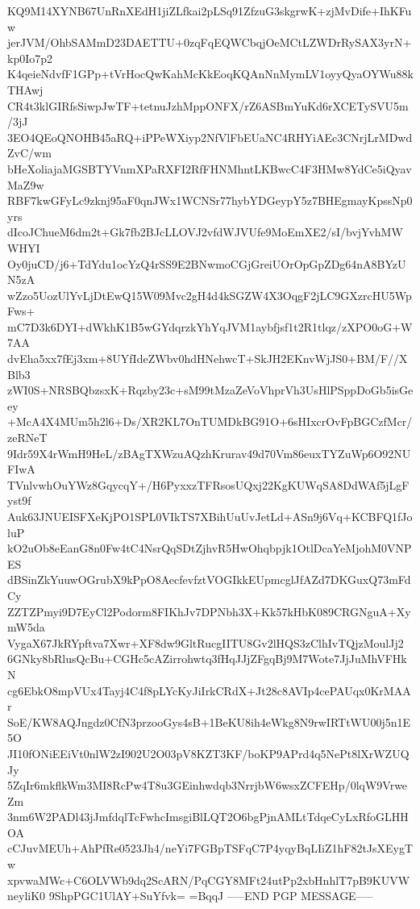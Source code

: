 KQ9M14XYNB67UnRnXEdH1jiZLfkai2pLSq91ZfzuG3skgrwK+zjMvDife+IhKFuw
jerJVM/OhbSAMmD23DAETTU+0zqFqEQWCbqjOeMCtLZWDrRySAX3yrN+kp0Io7p2
K4qeieNdvfF1GPp+tVrHocQwKahMcKkEoqKQAnNnMymLV1oyyQyaOYWu88kTHAwj
CR4t3klGIRfsSiwpJwTF+tetnuJzhMppONFX/rZ6ASBmYuKd6rXCETySVU5m/3jJ
3EO4QEoQNOHB45aRQ+iPPeWXiyp2NfVlFbEUaNC4RHYiAEc3CNrjLrMDwdZvC/wm
bHeXoliajaMGSBTYVnmXPaRXFI2RfFHNMhntLKBwcC4F3HMw8YdCe5iQyavMaZ9w
RBF7kwGFyLc9zknj95aF0qnJWx1WCNSr77hybYDGeypY5z7BHEgmayKpssNp0yrs
dIcoJChueM6dm2t+Gk7fb2BJcLLOVJ2vfdWJVUfe9MoEmXE2/sI/bvjYvhMWWHYI
Oy0juCD/j6+TdYdu1ocYzQ4rSS9E2BNwmoCGjGreiUOrOpGpZDg64nA8BYzUN5zA
wZzo5UozUlYvLjDtEwQ15W09Mvc2gH4d4kSGZW4X3OqgF2jLC9GXzrcHU5WpFws+
mC7D3k6DYI+dWkhK1B5wGYdqrzkYhYqJVM1aybfjsf1t2R1tlqz/zXPO0oG+W7AA
dvEha5xx7fEj3xm+8UYfIdeZWbv0hdHNehwcT+SkJH2EKnvWjJS0+BM/F//XBlb3
zWI0S+NRSBQbzsxK+Rqzby23c+sM99tMzaZeVoVhprVh3UsHlPSppDoGb5isGeey
+McA4X4MUm5h2l6+Ds/XR2KL7OnTUMDkBG91O+6sHIxcrOvFpBGCzfMcr/zeRNeT
9Idr59X4rWmH9HeL/zBAgTXWzuAQzhKrurav49d70Vm86euxTYZuWp6O92NUFIwA
TVnlvwhOuYWz8GqycqY+/H6PyxxzTFRsosUQxj22KgKUWqSA8DdWAf5jLgFyst9f
Auk63JNUEISFXeKjPO1SPL0VIkTS7XBihUuUvJetLd+ASn9j6Vq+KCBFQ1fJoluP
kO2uOb8eEanG8n0Fw4tC4NsrQqSDtZjhvR5HwOhqbpjk1OtlDcaYeMjohM0VNPES
dBSinZkYuuwOGrubX9kPpO8AecfevfztVOGIkkEUpmcglJfAZd7DKGuxQ73mFdCy
ZZTZPmyi9D7EyCl2Podorm8FIKhJv7DPNbh3X+Kk57kHbK089CRGNguA+XymW5da
VygaX67JkRYpftva7Xwr+XF8dw9GltRucgIITU8Gv2lHQS3zClhIvTQjzMoulJj2
6GNky8bRlusQcBu+CGHc5cAZirrohwtq3fHqJJjZFgqBj9M7Wote7JjJuMhVFHkN
cg6EbkO8mpVUx4Tayj4C4f8pLYcKyJiIrkCRdX+Jt28c8AVIp4cePAUqx0KrMAAr
SoE/KW8AQJngdz0CfN3przooGys4sB+1BeKU8ih4eWkg8N9rwIRTtWU00j5n1E5O
JI10fONiEEiVt0nlW2zI902U2O03pV8KZT3KF/boKP9APrd4q5NePt8lXrWZUQJy
5ZqIr6mkflkWm3MI8RcPw4T8u3GEinhwdqb3NrrjbW6wsxZCFEHp/0lqW9VrweZm
3nm6W2PADl43jJmfdqlTcFwhcImsgiBlLQT2O6bgPjnAMLtTdqeCyLxRfoGLHHOA
cCJuvMEUh+AhPfRe0523Jh4/neYi7FGBpTSFqC7P4yqyBqLIiZ1hF82tJsXEygTw
xpvwaMWc+C6OLVWb9dq2ScARN/PqCGY8MFt24utPp2xbHnhlT7pB9KUVWneyliK0
9ShpPGC1UlAY+SuYfvk=
=BqqJ
-----END PGP MESSAGE-----
